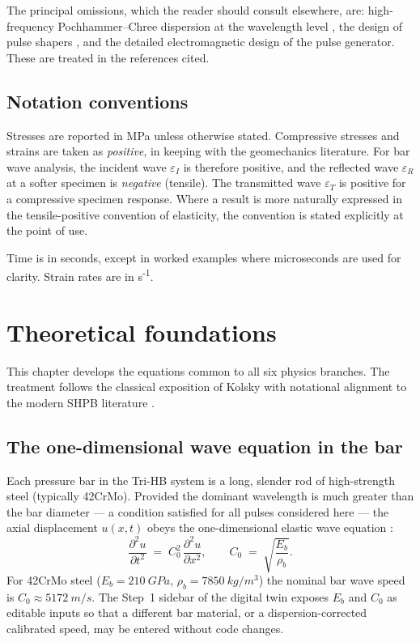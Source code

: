 \documentclass[11pt,a4paper,openany]{book}
\providecommand{\SI}[2]{\qty{#1}{#2}}
\theoremstyle{handbook}
\newcommand{\eps}{\varepsilon}
\newcommand{\Cz}{C_0}
\begin{document}
The principal omissions, which the reader should consult elsewhere, are:
high-frequency Pochhammer--Chree dispersion at the wavelength level
\cite{Davies1948,GrahamPC}, the design of pulse shapers
\cite{FrewForrestal2002}, and the detailed electromagnetic design of the
pulse generator. These are treated in the references cited.

\section{Notation conventions}

Stresses are reported in MPa unless otherwise stated. Compressive stresses
and strains are taken as \emph{positive}, in keeping with the geomechanics
literature. For bar wave analysis, the incident wave $\eps_I$ is therefore
positive, and the reflected wave $\eps_R$ at a softer specimen is
\emph{negative} (tensile). The transmitted wave $\eps_T$ is positive for a
compressive specimen response. Where a result is more naturally expressed in
the tensile-positive convention of elasticity, the convention is stated
explicitly at the point of use.

Time is in seconds, except in worked examples where microseconds are used for
clarity. Strain rates are in s\textsuperscript{-1}.

\chapter{Theoretical foundations}\label{ch:foundations}

This chapter develops the equations common to all six physics branches. The
treatment follows the classical exposition of Kolsky \cite{Kolsky1949,Kolsky1963}
with notational alignment to the modern SHPB literature
\cite{ChenSong2011,GrayHandbook}.

\section{The one-dimensional wave equation in the bar}\label{sec:wave-eq}

Each pressure bar in the Tri-HB system is a long, slender rod of high-strength
steel (typically 42CrMo). Provided the dominant wavelength is much greater
than the bar diameter --- a condition satisfied for all pulses considered here
--- the axial displacement $u(x,t)$ obeys the one-dimensional elastic wave
equation \cite{Graff1975}:
\begin{equation}
  \frac{\partial^{2}u}{\partial t^{2}} \;=\; \Cz^{2}\,\frac{\partial^{2}u}{\partial x^{2}},
  \qquad
  \Cz \;=\; \sqrt{\frac{E_b}{\rho_b}} .
  \label{eq:wave-eq}
\end{equation}
For 42CrMo steel ($E_b = \SI{210}{GPa}$, $\rho_b = \SI{7850}{kg/m^{3}}$) the
nominal bar wave speed is $\Cz \approx \SI{5172}{m/s}$. The Step~1 sidebar of
the digital twin exposes $E_b$ and $\Cz$ as editable inputs so that a
different bar material, or a dispersion-corrected calibrated speed, may be
entered without code changes.
\end{document}
